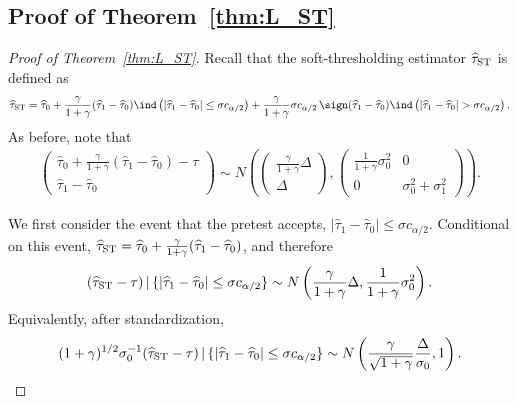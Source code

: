 \documentclass[11pt]{article}
\def\given{\,|\,}
\newcommand{\htau}{\widehat\tau}
\numberwithin{equation}{section}
\theoremstyle{definition}
\begin{document}
\subsection{Proof of Theorem~\ref{thm:L_ST}}


\begin{proof}[Proof of Theorem~\ref{thm:L_ST}]
Recall that the soft-thresholding estimator $\htau_{\rm ST}$ is defined as 
\[
  \htau_{\rm ST}= \htau_0 + \frac{\gamma}{1+\gamma} (\htau_1 - \htau_0)\ind\left(\lvert \htau_1 - \htau_0 \rvert \le \sigma c_{\alpha/2}\right) 
  + \frac{\gamma}{1+\gamma} \sigma c_{\alpha/2}\,\sign(\htau_1 - \htau_0)\ind\left(\lvert \htau_1 - \htau_0 \rvert > \sigma c_{\alpha/2}\right).
\]
As before, note that
\begin{align*}
  \begin{pmatrix} \htau_0 + \frac{\gamma}{1+\gamma} (\htau_1-\htau_0)-\tau \\ \htau_1-\htau_0 \end{pmatrix} \sim N\left(\begin{pmatrix} \frac{\gamma}{1+\gamma} \Delta \\ \Delta\end{pmatrix}, \begin{pmatrix} \frac{1}{1+\gamma} \sigma_0^2 & 0 \\
  0 & \sigma_0^2 + \sigma_1^2
  \end{pmatrix}\right).
\end{align*}

We first consider the event that the pretest accepts, $\lvert \htau_1 - \htau_0 \rvert \le \sigma c_{\alpha/2}$. Conditional on this event, $\htau_{\rm ST} = \htau_0 + \frac{\gamma}{1+\gamma} (\htau_1 - \htau_0)$, and therefore
\begin{align*}
  (\htau_{\rm ST} - \tau) \given \{\lvert \htau_1 - \htau_0 \rvert \le \sigma c_{\alpha/2}\} \sim N\left(\frac{\gamma}{1+\gamma} \Delta, \frac{1}{1+\gamma} \sigma_0^2\right).
\end{align*}
Equivalently, after standardization,
\begin{align*}
  (1+\gamma)^{1/2} \sigma_0^{-1} (\htau_{\rm ST} - \tau) \given \{\lvert \htau_1 - \htau_0 \rvert \le \sigma c_{\alpha/2}\} \sim N\left(\frac{\gamma}{\sqrt{1+\gamma}} \frac{\Delta}{\sigma_0}, 1\right).
\end{align*}


\end{proof}
\end{document}
